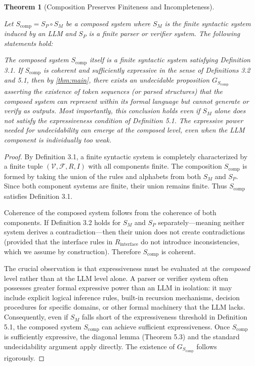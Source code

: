 \documentclass[11pt]{article}
\newtheorem{theorem}{Theorem}[section]
\begin{document}
\begin{theorem}[Composition Preserves Finiteness and Incompleteness]
\label{thm:composition_incompleteness}

Let $S_{\text{comp}} = S_P \circ S_M$ be a composed system where $S_M$ is the finite syntactic system induced by an LLM and $S_P$ is a finite parser or verifier system. The following statements hold:

The composed system $S_{\text{comp}}$ itself is a finite syntactic system satisfying Definition 3.1. If $S_{\text{comp}}$ is coherent and sufficiently expressive in the sense of Definitions 3.2 and 5.1, then by \ref{thm:main}, there exists an undecidable proposition $G_{S_{\text{comp}}}$ asserting the existence of token sequences (or parsed structures) that the composed system can represent within its formal language but cannot generate or verify as outputs. Most importantly, this conclusion holds \textit{even if} $S_M$ alone does not satisfy the expressiveness condition of Definition 5.1. The expressive power needed for undecidability can emerge at the composed level, even when the LLM component is individually too weak.

\end{theorem}

\begin{proof}
By Definition 3.1, a finite syntactic system is completely characterized by a finite tuple $(\mathcal{V}, \mathcal{F}, R, I)$ with all components finite. The composition $S_{\text{comp}}$ is formed by taking the union of the rules and alphabets from both $S_M$ and $S_P$. Since both component systems are finite, their union remains finite. Thus $S_{\text{comp}}$ satisfies Definition 3.1.

Coherence of the composed system follows from the coherence of both components. If Definition 3.2 holds for $S_M$ and $S_P$ separately—meaning neither system derives a contradiction—then their union does not create contradictions (provided that the interface rules in $R_{\text{interface}}$ do not introduce inconsistencies, which we assume by construction). Therefore $S_{\text{comp}}$ is coherent.

The crucial observation is that expressiveness must be evaluated at the \textit{composed} level rather than at the LLM level alone. A parser or verifier system often possesses greater formal expressive power than an LLM in isolation: it may include explicit logical inference rules, built-in recursion mechanisms, decision procedures for specific domains, or other formal machinery that the LLM lacks. Consequently, even if $S_M$ falls short of the expressiveness threshold in Definition 5.1, the composed system $S_{\text{comp}}$ can achieve sufficient expressiveness. Once $S_{\text{comp}}$ is sufficiently expressive, the diagonal lemma (Theorem 5.3) and the standard undecidability argument apply directly. The existence of $G_{S_{\text{comp}}}$ follows rigorously.
\end{proof}
\end{document}
